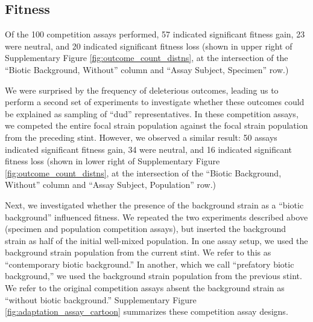

\subsection{Fitness}

% 

Of the 100 competition assays performed, 57 indicated significant fitness gain, 23 were neutral, and 20 indicated significant fitness loss (shown in upper right of Supplementary Figure \ref{fig:outcome_count_distns}, at the intersection of the ``Biotic Background, Without'' column and ``Assay Subject, Specimen'' row.)

We were surprised by the frequency of deleterious outcomes, leading us to perform a second set of experiments to investigate whether these outcomes could be explained as sampling of ``dud'' representatives.
In these competition assays, we competed the entire focal strain population against the focal strain population from the preceding stint.
However, we observed a similar result: 50 assays indicated significant fitness gain, 34 were neutral, and 16 indicated significant fitness loss (shown in lower right of Supplementary Figure \ref{fig:outcome_count_distns}, at the intersection of the ``Biotic Background, Without'' column and ``Assay Subject, Population'' row.)

Next, we investigated whether the presence of the background strain as a ``biotic background'' influenced fitness.
We repeated the two experiments described above (specimen and population competition assays), but inserted the background strain as half of the initial well-mixed population.
In one assay setup, we used the background strain population from the current stint.
We refer to this as ``contemporary biotic background.''
In another, which we call ``prefatory biotic background,'' we used the background strain population from the previous stint.
We refer to the original competition assays absent the background strain as ``without biotic background.''
Supplementary Figure \ref{fig:adaptation_assay_cartoon} summarizes these competition assay designs.

